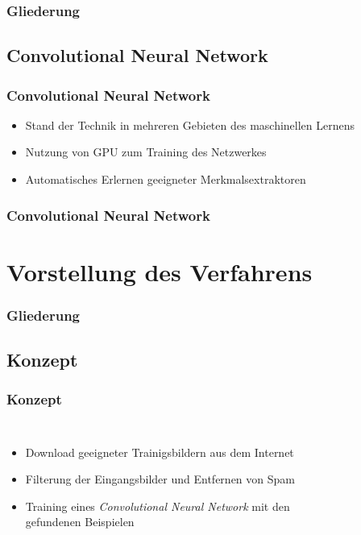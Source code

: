 \documentclass[utf8]{beamer}
\begin{document}
\begin{frame}
    \frametitle{Gliederung}
    \tableofcontents[currentsection]
\end{frame}

\subsection{Convolutional Neural Network}
\begin{frame}
    \frametitle{Convolutional Neural Network}
    \begin{itemize}
        \item Stand der Technik in mehreren Gebieten des maschinellen Lernens
        \item Nutzung von GPU zum Training des Netzwerkes
        \item Automatisches Erlernen geeigneter Merkmalsextraktoren
    \end{itemize}
    \begin{figure}

    \end{figure}
\end{frame}

\begin{frame}
    \frametitle{Convolutional Neural Network}
    \begin{figure}

    \end{figure}
\end{frame}

\section[Verfahrensbeschreibung]{Vorstellung des Verfahrens}

\begin{frame}
    \frametitle{Gliederung}
    \tableofcontents[currentsection]
\end{frame}

\subsection{Konzept}
\begin{frame}
    \frametitle{Konzept}
    \begin{columns}[c]
            \begin{itemize}
                \item Download geeigneter Trainigsbildern aus dem Internet
                \item Filterung der Eingangsbilder und Entfernen von Spam
                \item Training eines \emph{Convolutional Neural Network} mit den gefundenen Beispielen
            \end{itemize}
        \begin{figure}

        \end{figure}
    \end{columns}
\end{frame}
\end{document}
